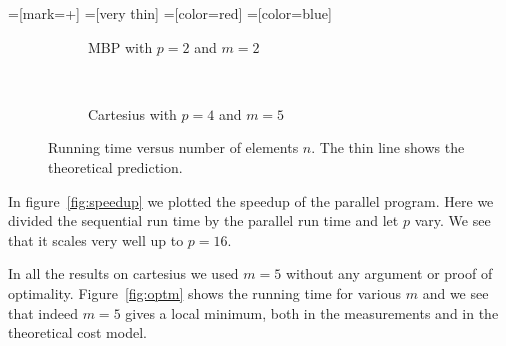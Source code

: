 =[mark=+]
=[very thin]
=[color=red]
=[color=blue]
\begin{figure}
	\centering
	\begin{subfigure}[b]{0.5\textwidth}
		\caption{MBP with $p=2$ and $m=2$}
	\end{subfigure}~
	\begin{subfigure}[b]{0.5\textwidth}
		\caption{Cartesius with $p=4$ and $m=5$}
	\end{subfigure}
	\caption{Running time versus number of elements $n$. The thin line shows the theoretical prediction.}
	\label{fig:basicplot}
\end{figure}

In figure~\ref{fig:speedup} we plotted the speedup of the parallel program. Here we divided the sequential run time by the parallel run time and let $p$ vary. We see that it scales very well up to $p = 16$.

In all the results on cartesius we used $m=5$ without any argument or proof of optimality. Figure~\ref{fig:optm} shows the running time for various $m$ and we see that indeed $m=5$ gives a local minimum, both in the measurements and in the theoretical cost model.

